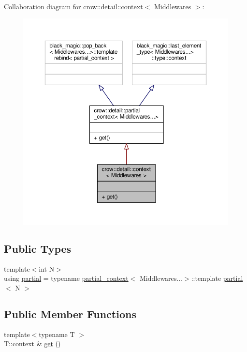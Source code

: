 Collaboration diagram for crow\-:\-:detail\-:\-:context$<$ Middlewares $>$\-:
\nopagebreak
\begin{figure}[H]
\begin{center}
\leavevmode
\includegraphics[width=350pt]{structcrow_1_1detail_1_1context__coll__graph}
\end{center}
\end{figure}
\subsection*{Public Types}
\begin{DoxyCompactItemize}
\item 
{\footnotesize template$<$int N$>$ }\\using \hyperlink{structcrow_1_1detail_1_1context_aed24bba34e07bac2e533be71003ce1f1}{partial} = typename \hyperlink{structcrow_1_1detail_1_1partial__context}{partial\-\_\-context}$<$ Middlewares...$>$\-::template \hyperlink{structcrow_1_1detail_1_1context_aed24bba34e07bac2e533be71003ce1f1}{partial}$<$ N $>$
\end{DoxyCompactItemize}
\subsection*{Public Member Functions}
\begin{DoxyCompactItemize}
\item 
{\footnotesize template$<$typename T $>$ }\\T\-::context \& \hyperlink{structcrow_1_1detail_1_1context_a836ff37a47e92e44b7f937687bfb06e5}{get} ()
\end{DoxyCompactItemize}
